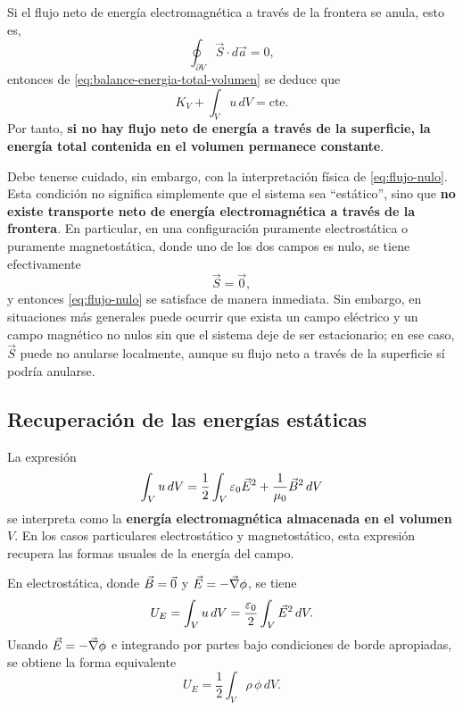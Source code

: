 \documentclass[../main.tex]{subfiles}
\begin{document}
Si el flujo neto de energía electromagnética a través de la frontera se anula, esto es,
\begin{equation}
    \oint_{\partial V}\vec S\cdot d\vec a=0,
    \label{eq:flujo-nulo}
\end{equation}
entonces de \eqref{eq:balance-energia-total-volumen} se deduce que
\begin{equation*}
    K_V+\int_V u\,dV=\mathrm{cte}.
\end{equation*}
Por tanto, \textbf{si no hay flujo neto de energía a través de la superficie, la energía total contenida en el volumen permanece constante}.

Debe tenerse cuidado, sin embargo, con la interpretación física de \eqref{eq:flujo-nulo}. Esta condición no significa simplemente que el sistema sea “estático”, sino que \textbf{no existe transporte neto de energía electromagnética a través de la frontera}. En particular, en una configuración puramente electrostática o puramente magnetostática, donde uno de los dos campos es nulo, se tiene efectivamente
\begin{equation*}
    \vec S=\vec 0,
\end{equation*}
y entonces \eqref{eq:flujo-nulo} se satisface de manera inmediata. Sin embargo, en situaciones más generales puede ocurrir que exista un campo eléctrico y un campo magnético no nulos sin que el sistema deje de ser estacionario; en ese caso, \(\vec S\) puede no anularse localmente, aunque su flujo neto a través de la superficie sí podría anularse.

\subsection*{Recuperación de las energías estáticas}

La expresión
\begin{equation*}
    \int_V u\,dV =\frac{1}{2} \int_V \varepsilon_0\vec{E}^2+\frac{1}{\mu_0}\vec{B}^2\,dV
\end{equation*}
se interpreta como la \textbf{energía electromagnética almacenada en el volumen} $V$. En los casos particulares electrostático y magnetostático, esta expresión recupera las formas usuales de la energía del campo.

En electrostática, donde $\vec{B}=\vec 0$ y $\vec{E}=-\vec\nabla\phi$, se tiene
\begin{equation*}
    U_E=\int_V u\,dV=\frac{\varepsilon_0}{2}\int_V \vec{E}^2\,dV.
\end{equation*}
Usando $\vec{E}=-\vec\nabla\phi$ e integrando por partes bajo condiciones de borde apropiadas, se obtiene la forma equivalente
\begin{equation*}
    U_E=\frac{1}{2}\int_V \rho\,\phi\,dV.
\end{equation*}
\end{document}
